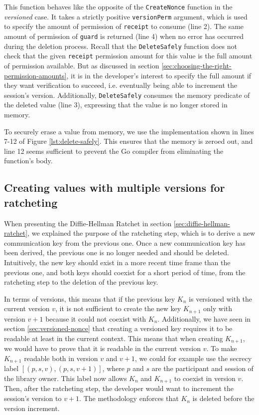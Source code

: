 This function behaves like the opposite of the \texttt{CreateNonce} function in the \emph{versioned} case.
It takes a strictly positive \texttt{versionPerm} argument, which is used to specify the amount of permission of \texttt{receipt} to consume (line 2).
The same amount of permission of \texttt{guard} is returned (line 4) when no error has occurred during the deletion process.
Recall that the \texttt{DeleteSafely} function does not check that the given \texttt{receipt} permission amount for this value is the full amount of permission available.
But as discussed in section \ref{sec:choosing-the-right-permission-amounts}, it is in the developer's interest to specify the full amount if they want verification to succeed, i.e. eventually being able to increment the session's version.
Additionally, \texttt{DeleteSafely} consumes the memory predicate of the deleted value (line 3), expressing that the value is no longer stored in memory.

To securely erase a value from memory, we use the implementation shown in lines 7-12 of Figure \ref{lst:delete-safely}.
This ensures that the memory is zeroed out, and line 12 seems sufficient to prevent the Go compiler from eliminating the function's body.

\subsection{Creating values with multiple versions for ratcheting}
\label{sec:creating-values-with-multiple-versions-for-ratcheting}

When presenting the Diffie-Hellman Ratchet in section \ref{sec:diffie-hellman-ratchet}, we explained the purpose of the ratcheting step, which is to derive a new communication key from the previous one. Once a new communication key has been derived, the previous one is no longer needed and should be deleted.
Intuitively, the new key should exist in a more recent time frame than the previous one, and both keys should coexist for a short period of time, from the ratcheting step to the deletion of the previous key.

In terms of versions, this means that if the previous key $K_n$ is versioned with the current version $v$, it is not sufficient to create the new key $K_{n+1}$ only with version $v+1$ because it could not coexist with $K_n$.
Additionally, we have seen in section \ref{sec:versioned-nonce} that creating a versioned key requires it to be readable at least in the current context. This means that when creating $K_{n+1}$, we would have to prove that it is readable in the current version $v$. To make $K_{n+1}$ readable both in version $v$ and $v+1$, we could for example use the secrecy label $[(p,s,v), (p,s,v+1)]$, where $p$ and $s$ are the participant and session of the library owner.
This label now allows $K_n$ and $K_{n+1}$ to coexist in version $v$.
Then, after the ratcheting step, the developer would want to increment the session's version to $v+1$. The methodology enforces that $K_n$ is deleted before the version increment.

